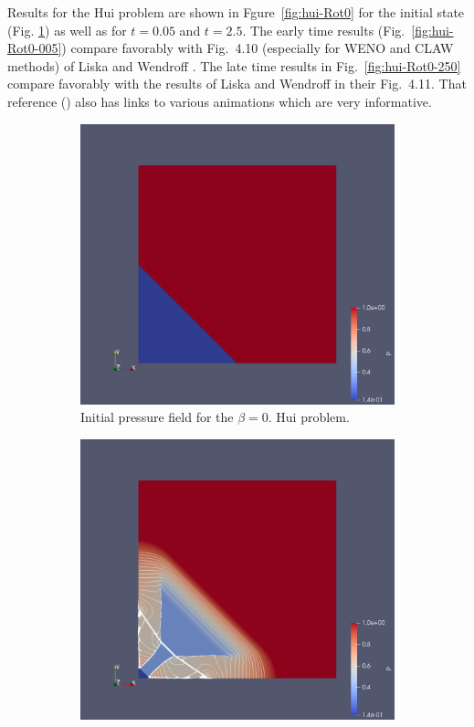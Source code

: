 Results for the Hui problem are shown in Fgure~\ref{fig:hui-Rot0} for the initial state (Fig. \ref{fig:hui-Rot0-0}) as well as for $t = 0.05$ and $t = 2.5$.  The early time results (Fig.~\ref{fig:hui-Rot0-005}) compare favorably with Fig.\ 4.10 (especially for WENO and CLAW methods) of Liska and Wendroff \cite{Liska}.  The late time results in Fig.~\ref{fig:hui-Rot0-250} compare favorably with the results of Liska and Wendroff in their Fig.\ 4.11.  That reference (\cite{Liska}) also has links to various animations which are very informative.

\begin{figure}[h!]
\centering
\begin{subfigure}[h!]{0.4\linewidth}
\centering
\includegraphics[scale=0.16]{figures/GAH-Hui-400-000.pdf }
\caption{Initial pressure field for the $\beta = 0.$ Hui problem.\bigskip \bigskip}
  \label{fig:hui-Rot0-0}
\end{subfigure}
\begin{subfigure}[h!]{0.4\linewidth}
\centering
\includegraphics[scale=0.16]{figures/GAH-Hui-400-005.pdf }

\end{subfigure}
\end{figure}
